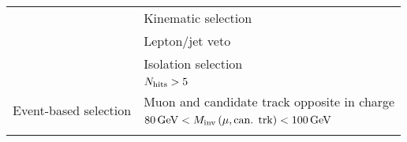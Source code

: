 \begin{table}[!h]
{\begin{tabular}{l|l }
                                                               &  Kinematic selection    \\
                                                               &  Lepton/jet veto        \\   
                                                               &  Isolation selection    \\  
                                                               &  $N_{\text{hits}}>5$             \\  
\midrule
\multirow{2}{*}{Event-based selection}                         &  Muon and candidate track opposite in charge                                     \\
                                                               &  $80\,\text{Ge}\kern-0.06667em\text{V}<M_{\text{inv}}\left(\mu,\text{can. trk} \right)<100\,\text{Ge}\kern-0.06667em\text{V}$        \\

\bottomrule
\multicolumn{2}{c}{} \\
\end{tabular}}
\end{table}

